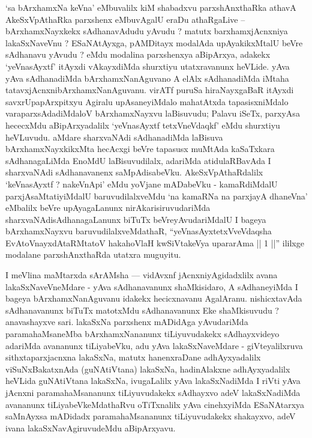 \begin{artha}
`sa bArxhamxNa keVna' eMbuvalilx kiM shabadxvu parxshAnxthaRka athavA AkeSxVpAthaRka parxshenx eMbuvAgalU eraDu athaRgaLive -- bArxhamxNayxkekx sAdhanavAdudu yAvudu ? matutx barxhamxjAcnxniya lakaSxNaveVnu ? ESaNAtAyxga, pAMDitayx modalAda upAyakikxMtalU beVre sAdhanavu yAvudu ? eMdu modalina parxshenxya aBipArxya, adakekx `yeVnasAyxtf' itAyxdi vAkayxdiMda shurxtiyu utatxravanunx heVLide. yAva yAva sAdhanadiMda bArxhamxNanAguvano A elAlx sAdhanadiMda iMtaha tatavxjAcnxnibArxhamxNanAguvanu. virATf puruSa hiraNayxgaBaR itAyxdi savxrUpapArxpitxyu Agiralu upAsaneyiMdalo mahatAtxda tapasisxniMdalo varaparxsAdadiMdaloV bArxhamxNayxvu laBisuvudu; Palavu iSeTx, parxyAsa hececxMdu aBipArxyadalilx `yeVnasAyxtf tetxVneVdaqkf' eMdu shurxtiyu heVLuvudu. aMdare sharxvaNAdi sAdhanadiMda laBisuva bArxhamxNayxkikxMta hecAcxgi beVre tapasusx muMtAda kaSaTxkara sAdhanagaLiMda EnoMdU laBisuvudilalx, adariMda atidulaRBavAda I sharxvaNAdi sAdhanavanenx saMpAdisabeVku. AkeSxVpAthaRdalilx `keVnasAyxtf ? nakeVnApi' eMdu yoVjane mADabeVku - kamaRdiMdalU parxjAsaMtatiyiMdalU baruvudilalxveMdu `na kamaRNa na parxjayA dhaneVna' eMbalilx beVre upAyagaLanunx nirAkarisiruvudariMda sharxvaNAdisAdhanagaLanunx biTuTx beVreyAvudariMdalU I bageya bArxhamxNayxvu baruvudilalxveMdathaR, ``yeVnasAyxtetxVveVdaqsha EvAtoV\s nayxdAtaRMtatoV hakahoVlaH kwSiVtakeVya upararAma || 1 ||'' ililxge modalane parxshAnxthaRda utatxra muguyitu.
\end{artha}

\begin{artha}
I meVlina maMtarxda sArAMsha --- vidAvxnf jAcnxniyAgidadxlilx avana lakaSxNaveVneMdare - yAva sAdhanavanunx shaMkisidaro, A sAdhaneyiMda I bageya bArxhamxNanAguvanu idakekx hecicxnavanu AgalAranu. nishicxtavAda sAdhanavanunx biTuTx matotxMdu sAdhanavanunx Eke shaMkisuvudu ? anavashayxve sari. lakaSxNa parxshenx mADidAga yAvudariMda paramahaMsaneMba bArxhamxNananunx tiLiyuvudakekx sAdhayxvideyo adariMda avananunx tiLiyabeVku, adu yAva lakaSxNaveMdare - giVteyalilxruva sithxtaparxjacnxna lakaSxNa, matutx hanenxraDane adhAyxyadalilx viSuNxBakatxnAda (guNAtiVtana) lakaSxNa, hadinAlakxne adhAyxyadalilx heVLida guNAtiVtana lakaSxNa, ivugaLalilx yAva lakaSxNadiMda I riVti yAva jAcnxni paramahaMsananunx tiLiyuvudakekx sAdhayxvo adeV lakaSxNadiMda avananunx tiLiyabeVkeMdathaRvu oTiTxnalilx yAva cinehxyiMda ESaNAtarxya saMnAyxsa mADidadx paramahaMsananunx tiLiyuvudakekx shakayxvo, adeV ivana lakaSxNavAgiruvudeMdu aBipArxyavu.
\end{artha}

